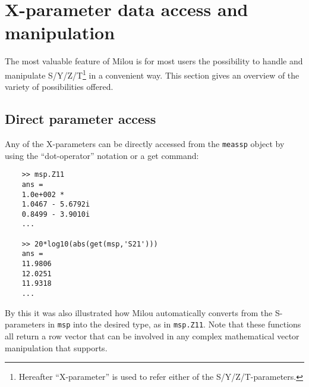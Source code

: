 %
%
%
\section{X-parameter data access and manipulation}\label{sec:SPMod}
The most valuable feature of Milou is for most users the
possibility to handle and manipulate S/Y/Z/T\footnote{Hereafter
``X-parameter'' is used to refer either of the
S/Y/Z/T-parameters.} in a convenient way. This section gives an
overview of the variety of possibilities offered.

\subsection{Direct parameter access}
Any of the X-parameters can be directly accessed from the
\verb"meassp" object by using the ``dot-operator'' notation or a
get command:

\begin{small}
\begin{verbatim}
    >> msp.Z11
    ans =
    1.0e+002 *
    1.0467 - 5.6792i
    0.8499 - 3.9010i
    ...

    >> 20*log10(abs(get(msp,'S21')))
    ans =
    11.9806
    12.0251
    11.9318
    ...
\end{verbatim}
\end{small}

By this it was also illustrated how Milou automatically converts
from the S-para\-meters in \verb"msp" into the desired type, as in
\verb"msp.Z11". Note that these functions all return a row vector
that can be involved in any complex mathematical vector
manipulation that \matlab supports.

